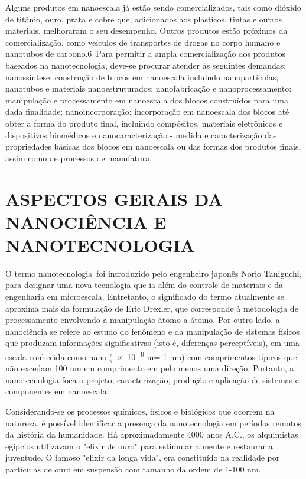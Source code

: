 \documentclass[10pt]{scrartcl}
\begin{document}
Alguns produtos em nanoescala já estão sendo comercializados, tais como dióxido de titânio, ouro, prata e cobre que, adicionados aos plásticos, tintas e outros materiais, melhoraram o seu desempenho. Outros produtos estão próximos da comercialização, como veículos de transportes de drogas no corpo humano e nanotubos de carbono.6 Para permitir a ampla comercialização dos produtos baseados na nanotecnologia, deve-se procurar atender às seguintes demandas: nanossíntese: construção de blocos em nanoescala incluindo nanopartículas, nanotubos e materiais nanoestruturados; nanofabricação e nanoprocessamento: manipulação e processamento em nanoescala dos blocos construídos para uma dada finalidade; nanoincorporação: incorporação em nanoescala dos blocos até obter a forma do produto final, incluindo compósitos, materiais eletrônicos e dispositivos biomédicos e nanocaracterização - medida e caracterização das propriedades básicas dos blocos em nanoescala ou das formas dos produtos finais, assim como de processos de manufatura.

\section{ASPECTOS GERAIS DA NANOCIÊNCIA E NANOTECNOLOGIA}
\label{sec:orgf0129ce}

O termo nanotecnologia foi introduzido pelo engenheiro japonês Norio Taniguchi, para designar uma nova tecnologia que ia além do controle de materiais e da engenharia em microescala. Entretanto, o significado do termo atualmente se aproxima mais da formulação de Eric Drexler, que corresponde à metodologia de processamento envolvendo a manipulação átomo a átomo. Por outro lado, a nanociência se refere ao estudo do fenômeno e da manipulação de sistemas físicos que produzam informações significativas (isto é, diferenças perceptíveis), em uma escala conhecida como nano (\num{e-9} m= 1 nm) com comprimentos típicos que não excedam 100 nm em comprimento em pelo menos uma direção. Portanto, a nanotecnologia foca o projeto, caracterização, produção e aplicação de sistemas e componentes em nanoescala.

Considerando-se os processos químicos, físicos e biológicos que ocorrem na natureza, é possível identificar a presença da nanotecnologia em períodos remotos da história da humanidade. Há aproximadamente 4000 anos A.C., os alquimistas egípcios utilizavam o "elixir de ouro" para estimular a mente e restaurar a juventude. O famoso "elixir da longa vida", era constituído na realidade por partículas de ouro em suspensão com tamanho da ordem de 1-100 nm.
\end{document}
